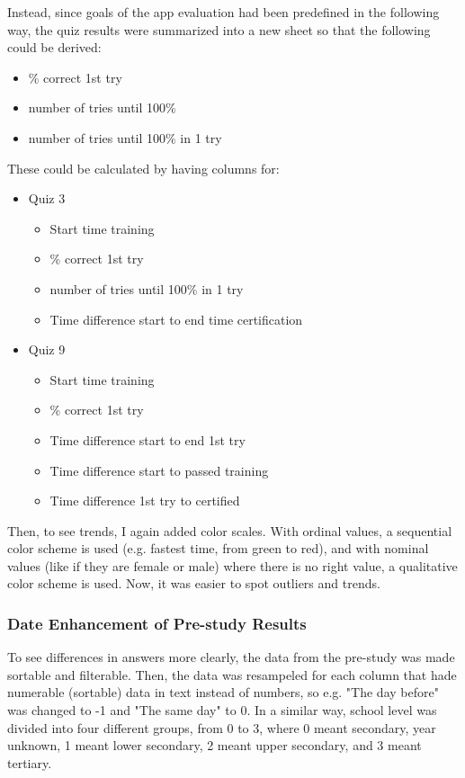 Instead, since goals of the app evaluation had been predefined in the following way, the quiz results were summarized into a new sheet so that the following could be derived:

\begin{itemize}
\item \% correct 1st try
\item number of tries until 100\%
\item number of tries until 100\% in 1 try
\end{itemize}

These could be calculated by having columns for:

\begin{itemize}
  \item Quiz 3
  \begin{itemize}
    \item Start time training
    \item \% correct 1st try
    \item number of tries until 100\% in 1 try
    \item Time difference start to end time certification
  \end{itemize}
  \item Quiz 9
  \begin{itemize}
    \item Start time training
    \item \% correct 1st try
    \item Time difference start to end 1st try
    \item Time difference start to passed training
    \item Time difference 1st try to certified
  \end{itemize}
\end{itemize}

Then, to see trends, I again added color scales. With ordinal values, a sequential color scheme is used (e.g. fastest time, from green to red), and with nominal values (like if they are female or male) where there is no right value, a qualitative color scheme is used. Now, it was easier to spot outliers and trends.

\subsubsection{Date Enhancement of Pre-study Results}
To see differences in answers more clearly, the data from the pre-study was made sortable and filterable. Then, the data was resampeled for each column that hade numerable (sortable) data in text instead of numbers, so e.g. "The day before" was changed to -1 and "The same day" to 0. In a similar way, school level was divided into four different groups, from 0 to 3, where 0 meant secondary, year unknown, 1 meant lower secondary, 2 meant upper secondary, and 3 meant tertiary.

